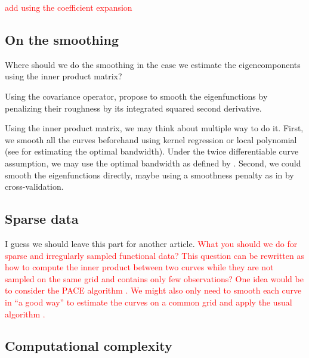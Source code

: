 \textcolor{red}{add using the coefficient expansion}


\subsection{On the smoothing} %
\label{sub:on_the_smoothing}

Where should we do the smoothing in the case we estimate the eigencomponents using the inner product matrix?

Using the covariance operator, \cite{ramsayFunctionalDataAnalysis2005} propose to smooth the eigenfunctions by penalizing their roughness by its integrated squared second derivative.

Using the inner product matrix, we may think about multiple way to do it. First, we smooth all the curves beforehand using kernel regression or local polynomial (see \cite{golovkineLearningSmoothnessNoisy2022} for estimating the optimal bandwidth). Under the twice differentiable curve assumption, we may use the optimal bandwidth as defined by \cite{tsybakovIntroductionNonparametricEstimation2009}. Second, we could smooth the eigenfunctions directly, maybe using a smoothness penalty as in \cite{ramsayFunctionalDataAnalysis2005} by cross-validation.

\subsection{Sparse data} %
\label{sub:sparse_data}

I guess we should leave this part for another article.
\textcolor{red}{What you should we do for sparse and irregularly sampled functional data? This question can be rewritten as how to compute the inner product between two curves while they are not sampled on the same grid and contains only few observations? One idea would be to consider the PACE algorithm \cite{yaoFunctionalDataAnalysis2005}. We might also only need to smooth each curve in ``a good way'' to estimate the curves on a common grid and apply the usual algorithm \cite{golovkineLearningSmoothnessNoisy2022}.}


\subsection{Computational complexity} %
\label{sub:computational_complexity}

